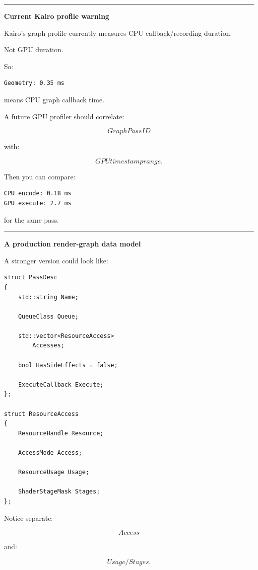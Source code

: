\begin{center}\rule{0.5\linewidth}{0.5pt}\end{center}

\textbf{Current Kairo profile warning}

Kairo's graph profile currently measures CPU callback/recording duration.

Not GPU duration.

So:

\begin{verbatim}
Geometry: 0.35 ms
\end{verbatim}

means CPU graph callback time.

A future GPU profiler should correlate:

\[
GraphPassID
\]

with:

\[
GPU timestamp range.
\]

Then you can compare:

\begin{verbatim}
CPU encode: 0.18 ms
GPU execute: 2.7 ms
\end{verbatim}

for the same pass.

\begin{center}\rule{0.5\linewidth}{0.5pt}\end{center}

\textbf{A production render-graph data model}

A stronger version could look like:

\begin{verbatim}
struct PassDesc
{
    std::string Name;

    QueueClass Queue;

    std::vector<ResourceAccess>
        Accesses;

    bool HasSideEffects = false;

    ExecuteCallback Execute;
};

struct ResourceAccess
{
    ResourceHandle Resource;

    AccessMode Access;

    ResourceUsage Usage;

    ShaderStageMask Stages;
};
\end{verbatim}

Notice separate:

\[
Access
\]

and:

\[
Usage/Stages.
\]

